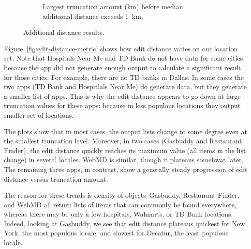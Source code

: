\documentclass[10pt, conference, compsocconf]{IEEEtran}
\newcommand{\app}[1]{#1}
\newcommand{\hospitals}{\app{Hospitals Near Me}}
\newcommand{\tdbank}{\app{TD Bank}}
\newcommand{\webmd}{\app{WebMD}}
\newcommand{\gasbuddy}{\app{Gasbuddy}}
\newcommand{\restaurantfinder}{\app{Restaurant Finder}}
\newcommand{\walmart}{\app{Walmart}}
\begin{document}
{\begin{figure}
\begin{subfigure}{\textwidth}
\begin{tabular}{|l||r|r|r|r|r|r|}
\end{tabular}
\caption{Largest truncation amount (km) before median additional
  distance exceeds 1~km.}
 \label{fig:knee-points-additional-cutoff}

  \end{subfigure}

\caption{Additional distance results.}
  
\end{figure}
 
Figure~\ref{fig:edit-distance-metric} shows how edit distance 
 varies
on our location set.  
Note that Hospitals Near Me and TD Bank do
not have data for some cities because the app did not generate enough output
to calculate a significant result for those cities.  
For example, there are no TD banks in Dallas.  In some cases the two apps 
(TD Bank and Hospitlals Near Me) do generate data, but they generate 
a smaller list of apps.  This is why the edit distance appears to go down
at large truncation values for these apps: because in less populous 
locations they output smaller set of locations.

The plots show that in most cases, the output lists change to some
degree even at the smallest truncation level. Moreover, in two cases
(Gasbuddy and Restaurant Finder), the edit distance quickly reaches
its maximum value (all items in the list change) in several
locales. WebMD is similar, though it plateaus somehwat later. The
remaining three apps, in contrast, show a generally steady progression
of edit distance versus truncation amount.

The reason for these trends is density of objects--Gasbuddy,
Restaurant Finder, and WebMD all return lists of items that can
commonly be found everywhere, whereas there may be only a few
hospitals, Walmarts, or TD Bank locations. Indeed, looking at
Gasbuddy, we see that edit distance plateaus quickest for New York,
the most populous locale, and slowest for Decatur, the least populous
locale.


}
\end{document}
